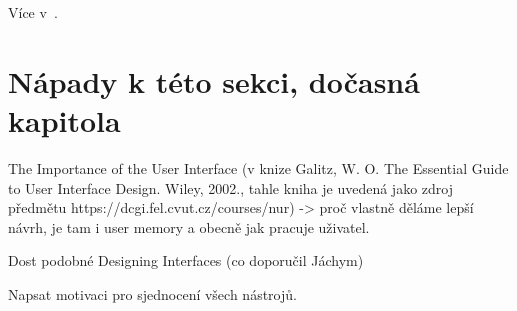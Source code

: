 Více v~\cite{MM_quecat}.


\section{Nápady k této sekci, dočasná kapitola}

The Importance of the User Interface (v knize Galitz, W. O. The Essential Guide to User Interface Design. Wiley, 2002., tahle kniha je uvedená jako zdroj předmětu https://dcgi.fel.cvut.cz/courses/nur) -> proč vlastně děláme lepší návrh, je tam i user memory a obecně jak pracuje uživatel.

Dost podobné Designing Interfaces (co doporučil Jáchym)

Napsat motivaci pro sjednocení všech nástrojů.

